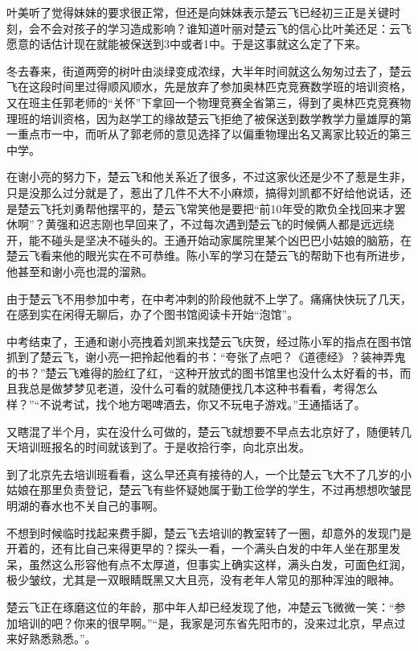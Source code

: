 叶美听了觉得妹妹的要求很正常，但还是向妹妹表示楚云飞已经初三正是关键时刻，会不会对孩子的学习造成影响？谁知道叶丽对楚云飞的信心比叶美还足：云飞愿意的话估计现在就能被保送到3中或者1中。于是这事就这么定了下来。

冬去春来，街道两旁的树叶由淡绿变成浓绿，大半年时间就这么匆匆过去了，楚云飞在这段时间里过得顺风顺水，先是放弃了参加奥林匹克竞赛数学班的培训资格，又在班主任郭老师的“关怀”下拿回一个物理竞赛全省第三，得到了奥林匹克竞赛物理班的培训资格，因为赵学工的缘故楚云飞拒绝了被保送到数学教学力量雄厚的第一重点市一中，而听从了郭老师的意见选择了以偏重物理出名又离家比较近的第三中学。

在谢小亮的努力下，楚云飞和他关系近了很多，不过这家伙还是少不了惹是生非，只是没那么过分就是了，惹出了几件不大不小麻烦，搞得刘凯都不好给他说话，还是楚云飞托刘勇帮他摆平的，楚云飞常笑他是要把“前10年受的欺负全找回来才罢休啊”？黄强和迟志刚也早回来了，不过每次遇到楚云飞的时候俩人都是远远绕开，能不碰头是坚决不碰头的。王通开始动家属院里某个凶巴巴小姑娘的脑筋，在楚云飞看来他的眼光实在不可恭维。陈小军的学习在楚云飞的帮助下也有所进步，他甚至和谢小亮也混的溜熟。

由于楚云飞不用参加中考，在中考冲刺的阶段他就不上学了。痛痛快快玩了几天，在感到实在闲得无聊后，办了个图书馆阅读卡开始“泡馆”。

中考结束了，王通和谢小亮拽着刘凯来找楚云飞庆贺，经过陈小军的指点在图书馆抓到了楚云飞，谢小亮一把拎起他看的书：“夸张了点吧？《道德经》？装神弄鬼的书？”楚云飞难得的脸红了红，“这种开放式的图书馆里也没什么太好看的书，而且我总是做梦梦见老道，没什么可看的就随便找几本这种书看看，考得怎么样？”“不说考试，找个地方喝啤酒去，你又不玩电子游戏。”王通插话了。

又瞎混了半个月，实在没什么可做的，楚云飞就想要不早点去北京好了，随便转几天培训班报名的时间就该到了。于是收拾行李，向北京出发。

到了北京先去培训班看看，这么早还真有接待的人，一个比楚云飞大不了几岁的小姑娘在那里负责登记，楚云飞有些怀疑她属于勤工俭学的学生，不过再想想吹皱昆明湖的春水也不关自己的事啊。

不想到时候临时找起来费手脚，楚云飞去培训的教室转了一圈，却意外的发现门是开着的，还有比自己来得更早的？探头一看，一个满头白发的中年人坐在那里发呆，虽然这么形容他有点不太厚道，但事实上确实这样，满头白发，可面色红润，极少皱纹，尤其是一双眼睛既黑又大且亮，没有老年人常见的那种浑浊的眼神。

楚云飞正在琢磨这位的年龄，那中年人却已经发现了他，冲楚云飞微微一笑：“参加培训的吧？你来的很早啊。”“是，我家是河东省先阳市的，没来过北京，早点过来好熟悉熟悉。”。

